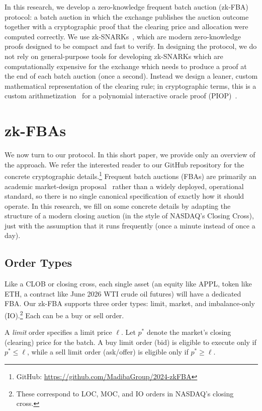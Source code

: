 \documentclass[runningheads]{llncs}
\begin{document}
In this research, we develop a zero-knowledge frequent batch auction (zk-FBA) protocol: a batch auction in which the exchange publishes the auction outcome together with a cryptographic proof that the clearing price and allocation were computed correctly. We use zk-SNARKs~\cite{GWC19}, which are modern zero-knowledge proofs designed to be compact and fast to verify. In designing the protocol, we do not rely on general-purpose tools for developing zk-SNARKs which are computationally expensive for the exchange which needs to produce a proof at the end of each batch auction (\eg once a second). Instead we design a leaner, custom mathematical representation of the clearing rule; in cryptographic terms, this is a custom arithmetization~\cite{vODC24} for a polynomial interactive oracle proof (PIOP)~\cite{BFS20}. %

\section{zk-FBAs}

We now turn to our protocol. In this short paper, we provide only an overview of the approach. We refer the interested reader to our GitHub repository for the concrete cryptographic details.\footnote{GitHub: \url{https://github.com/MadibaGroup/2024-zkFBA}} Frequent batch auctions (FBAs) are primarily an academic market-design proposal~\cite{BCS14} rather than a widely deployed, operational standard, so there is no single canonical specification of exactly how it should operate. In this research, we fill on some concrete details by adapting the structure of a modern closing auction (in the style of NASDAQ's Closing Cross), just with the assumption that it runs frequently (\eg once a minute instead of once a day).

\subsection{Order Types} 

Like a CLOB or closing cross, each single asset (\eg an equity like APPL, token like ETH, a contract like June 2026 WTI crude oil futures) will have a dedicated FBA. Our zk-FBA supports three order types: limit, market, and imbalance-only (IO).\footnote{These correspond to LOC, MOC, and IO orders in NASDAQ's closing cross.} Each can be a buy or sell order.

A \textit{limit} order specifies a limit price $\ell$. Let $p^*$ denote the market's closing (clearing) price for the batch. A buy limit order (bid) is eligible to execute only if $p^* \le \ell$, while a sell limit order (ask/offer) is eligible only if $p^* \ge \ell$. 
\end{document}
